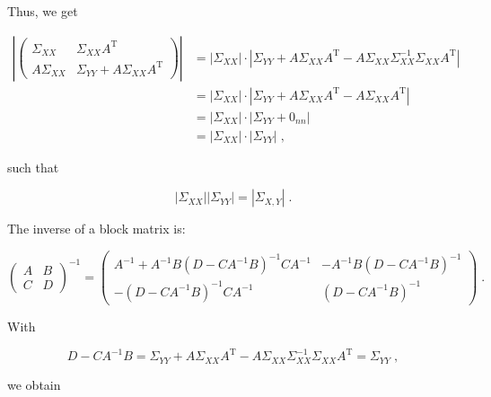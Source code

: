 \documentclass[a4paper,12pt]{article}
\begin{document}
Thus, we get

\begin{equation} \label{eq:Sigma-yy-det}
\begin{split}
\left| \begin{pmatrix}
\Sigma_{XX}   & \Sigma_{XX} A^\mathrm{T} \\
A \Sigma_{XX} & \Sigma_{YY} + A \Sigma_{XX} A^\mathrm{T}
\end{pmatrix} \right|
&= |\Sigma_{XX}| \cdot | \Sigma_{YY} + A \Sigma_{XX} A^\mathrm{T} - A \Sigma_{XX} \Sigma_{XX}^{-1} \Sigma_{XX} A^\mathrm{T} | \\
&= |\Sigma_{XX}| \cdot | \Sigma_{YY} + A \Sigma_{XX} A^\mathrm{T} - A \Sigma_{XX} A^\mathrm{T} | \\
&= |\Sigma_{XX}| \cdot | \Sigma_{YY} + 0_{nn} | \\
&= |\Sigma_{XX}| \cdot |\Sigma_{YY}| \; ,
\end{split}
\end{equation}

such that

\begin{equation} \label{eq:mvn-joint-pdf-s2}
|\Sigma_{XX}| |\Sigma_{YY}| = |\Sigma_{X,Y}| \; .
\end{equation}

The inverse of a block matrix is:

\begin{equation} \label{eq:block-inv}
  \begin{pmatrix} A & B \\ C & D \end{pmatrix}^{-1}
= \begin{pmatrix} 
A^{-1} + A^{-1}B (D - CA^{-1}B)^{-1} CA^{-1} & -A^{-1}B (D - CA^{-1}B)^{-1} \\
-(D - CA^{-1}B)^{-1} CA^{-1}                 & (D - CA^{-1}B)^{-1}
\end{pmatrix} \; .
\end{equation}

With

\begin{equation} \label{eq:Sigma-yy-inv-D}
  D - CA^{-1}B
= \Sigma_{YY} + A \Sigma_{XX} A^\mathrm{T} - A \Sigma_{XX} \Sigma_{XX}^{-1} \Sigma_{XX} A^\mathrm{T}
= \Sigma_{YY} \; ,
\end{equation}

we obtain
\end{document}

